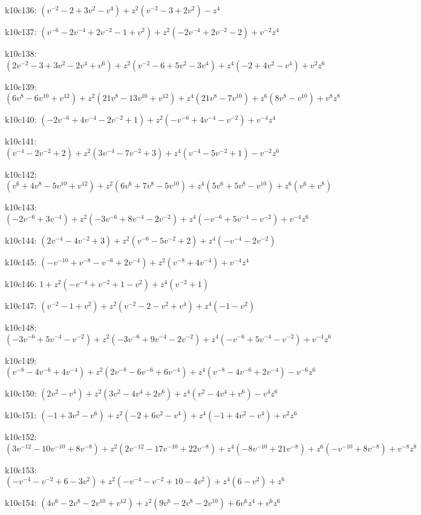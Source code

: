 k10c136: $ (v^{-2}-2+3v^{2}-v^{4})  +z^{2}(v^{-2}-3+2v^{2})  -z^{4} $ 

k10c137: $ (v^{-6}-2v^{-4}+2v^{-2}-1+v^{2})  +z^{2}(-2v^{-4}+2v^{-2}-2)  +v^{-2}z^{4} $ 

k10c138: $ (2v^{-2}-3+3v^{2}-2v^{4}+v^{6})  +z^{2}(v^{-2}-6+5v^{2}-3v^{4})  +z^{4}(-2+4v^{2}-v^{4})  +v^{2}z^{6} $ 

k10c139: $ (6v^{8}-6v^{10}+v^{12})  +z^{2}(21v^{8}-13v^{10}+v^{12})  +z^{4}(21v^{8}-7v^{10})  +z^{6}(8v^{8}-v^{10})  +v^{8}z^{8} $ 

k10c140: $ (-2v^{-6}+4v^{-4}-2v^{-2}+1)  +z^{2}(-v^{-6}+4v^{-4}-v^{-2})  +v^{-4}z^{4} $ 

k10c141: $ (v^{-4}-2v^{-2}+2)  +z^{2}(3v^{-4}-7v^{-2}+3)  +z^{4}(v^{-4}-5v^{-2}+1)  -v^{-2}z^{6} $ 

k10c142: $ (v^{6}+4v^{8}-5v^{10}+v^{12})  +z^{2}(6v^{6}+7v^{8}-5v^{10})  +z^{4}(5v^{6}+5v^{8}-v^{10})  +z^{6}(v^{6}+v^{8}) $ 

k10c143: $ (-2v^{-6}+3v^{-4})  +z^{2}(-3v^{-6}+8v^{-4}-2v^{-2})  +z^{4}(-v^{-6}+5v^{-4}-v^{-2})  +v^{-4}z^{6} $ 

k10c144: $ (2v^{-4}-4v^{-2}+3)  +z^{2}(v^{-6}-5v^{-2}+2)  +z^{4}(-v^{-4}-2v^{-2}) $ 

k10c145: $ (-v^{-10}+v^{-8}-v^{-6}+2v^{-4})  +z^{2}(v^{-8}+4v^{-4})  +v^{-4}z^{4} $ 

k10c146: $ 1  +z^{2}(-v^{-4}+v^{-2}+1-v^{2})  +z^{4}(v^{-2}+1) $ 

k10c147: $ (v^{-2}-1+v^{2})  +z^{2}(v^{-2}-2-v^{2}+v^{4})  +z^{4}(-1-v^{2}) $ 

k10c148: $ (-3v^{-6}+5v^{-4}-v^{-2})  +z^{2}(-3v^{-6}+9v^{-4}-2v^{-2})  +z^{4}(-v^{-6}+5v^{-4}-v^{-2})  +v^{-4}z^{6} $ 

k10c149: $ (v^{-8}-4v^{-6}+4v^{-4})  +z^{2}(2v^{-8}-6v^{-6}+6v^{-4})  +z^{4}(v^{-8}-4v^{-6}+2v^{-4})  -v^{-6}z^{6} $ 

k10c150: $ (2v^{2}-v^{4})  +z^{2}(3v^{2}-4v^{4}+2v^{6})  +z^{4}(v^{2}-4v^{4}+v^{6})  -v^{4}z^{6} $ 

k10c151: $ (-1+3v^{2}-v^{6})  +z^{2}(-2+6v^{2}-v^{4})  +z^{4}(-1+4v^{2}-v^{4})  +v^{2}z^{6} $ 

k10c152: $ (3v^{-12}-10v^{-10}+8v^{-8})  +z^{2}(2v^{-12}-17v^{-10}+22v^{-8})  +z^{4}(-8v^{-10}+21v^{-8})  +z^{6}(-v^{-10}+8v^{-8})  +v^{-8}z^{8} $ 

k10c153: $ (-v^{-4}-v^{-2}+6-3v^{2})  +z^{2}(-v^{-4}-v^{-2}+10-4v^{2})  +z^{4}(6-v^{2})  +z^{6} $ 

k10c154: $ (4v^{6}-2v^{8}-2v^{10}+v^{12})  +z^{2}(9v^{6}-2v^{8}-2v^{10})  +6v^{6}z^{4}  +v^{6}z^{6} $ 

